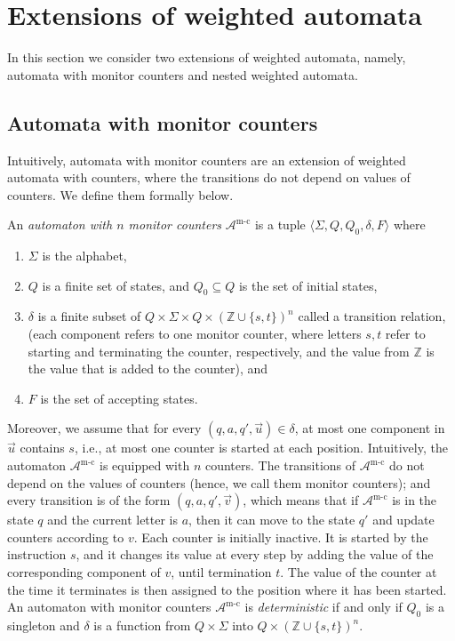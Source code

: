 \documentclass{lmcs}
\newcommand{\Paragraph}[1]{\noindent{\textbf{#1}}}
\newcommand{\Z}{\mathbb{Z}}
\newcommand{\tuple}[1]{\langle#1\rangle}
\newcommand{\aut}{\mathcal{A}}
\begin{document}
\section{Extensions of weighted automata}
\newcommand{\autDiff}{\aut_{\textrm{diff}}}
In this section we consider two extensions of weighted automata,
namely, automata with monitor counters and nested weighted automata.


\subsection{Automata with monitor counters}
Intuitively, automata with monitor counters are an extension of weighted automata
with counters, where the transitions do not depend on values of counters.
We define them formally below.

\Paragraph{Automata with monitor counters.}
\newcommand{\counterA}{\mathcal{A}^{\textrm{m-c}}}
An \emph{automaton with $n$ monitor counters} $\counterA$ is a tuple $\tuple{ \Sigma, Q, Q_0, \delta, F}$  where
\begin{enumerate}
\item $\Sigma$ is the alphabet,
\item $Q$ is a finite set of states, and $Q_0 \subseteq Q$ is the set of initial states,
\item $\delta$ is a finite subset of  $Q \times \Sigma \times Q \times {(\Z \cup \{ s,t \})}^n$ called a transition relation,
(each component refers to one monitor counter, where letters $s,t$ refer to starting  and terminating the  counter,
respectively, and the value from $\Z$ is the value that is added to the counter), and
\item $F$ is the set of accepting states.
\end{enumerate}
Moreover, we assume that for every $(q,a,q',\vec{u}) \in \delta$, at most one component in $\vec{u}$ contains $s$, i.e.,
at most one counter is started at each position.
Intuitively, the automaton $\counterA$ is equipped with $n$ counters.
The transitions of $\counterA$ do not depend on the values of counters (hence, we call them monitor counters); and
every transition is of the form $(q,a,q',\vec{v})$, which means that
if $\counterA$ is in the state $q$ and the current letter is $a$, then
it can move to the state $q'$ and update counters according to $v$.
Each counter is initially inactive.
It is started by the instruction $s$, and
it changes its value at every step by adding the value of the corresponding component of $v$,
until termination $t$.
The value of the counter at the time it terminates is then assigned to the position where it has been started.
An automaton with monitor counters $\counterA$ is \emph{deterministic} if and only if $Q_0$ is a singleton and $\delta$ is a function
from $Q \times \Sigma$ into $Q \times {(\Z \cup \{ s,t \})}^n$.
\end{document}
